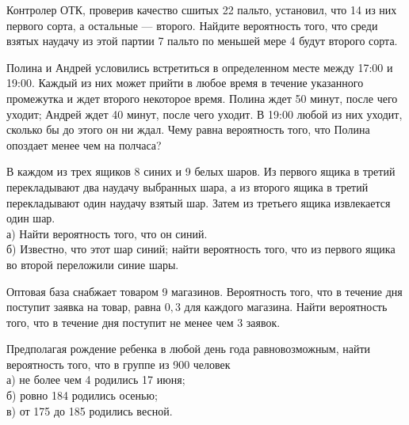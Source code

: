 \newpage\setcounter{zad}{0}



\begin{zkrW}{20}\noindent 
	Контролер ОТК, проверив качество сшитых 22 пальто, установил, что 14 из них первого сорта, а остальные --- второго. Найдите вероятность того, что среди взятых наудачу из этой партии 7 пальто по меньшей мере 4 будут второго сорта.
 
\end{zkrW}

\begin{zkrW}{20}\noindent 
	Полина и Андрей условились встретиться в определенном месте между 17:00 и 19:00. Каждый из них может прийти в любое время в течение указанного промежутка и ждет второго некоторое время. Полина ждет 50 минут, после чего уходит; Андрей ждет 40 минут, после чего уходит. В 19:00 любой из них уходит, сколько бы до этого он ни ждал. Чему равна вероятность того, что Полина опоздает менее чем на полчаса?
 
\end{zkrW}

\begin{zkrW}{20}\noindent 
	В каждом из трех ящиков 8 синих и 9 белых шаров. Из первого ящика в третий перекладывают два наудачу выбранных шара, а из второго ящика в третий перекладывают один наудачу взятый шар. Затем из третьего ящика извлекается один шар. \\ \indent а) Найти вероятность того, что он синий. \\ \indent б) Известно, что этот шар синий; найти вероятность того, что из первого ящика во второй переложили синие шары.
 
\end{zkrW}

\begin{zkrW}{20}\noindent 
	Оптовая база снабжает товаром 9 магазинов. Вероятность того, что в течение дня поступит заявка на товар, равна $0{,}3$ для каждого магазина. Найти вероятность того, что в течение дня поступит не менее чем 3 заявок.
 
\end{zkrW}

\begin{zkrW}{20}\noindent 
	Предполагая рождение ребенка в любой день года равновозможным, найти вероятность того, что в группе из 900 человек \\ \indent а) не более чем 4 родились 17 июня; \\ \indent б) ровно 184 родились осенью; \\ \indent в) от 175 до 185 родились весной.
 
\end{zkrW}

